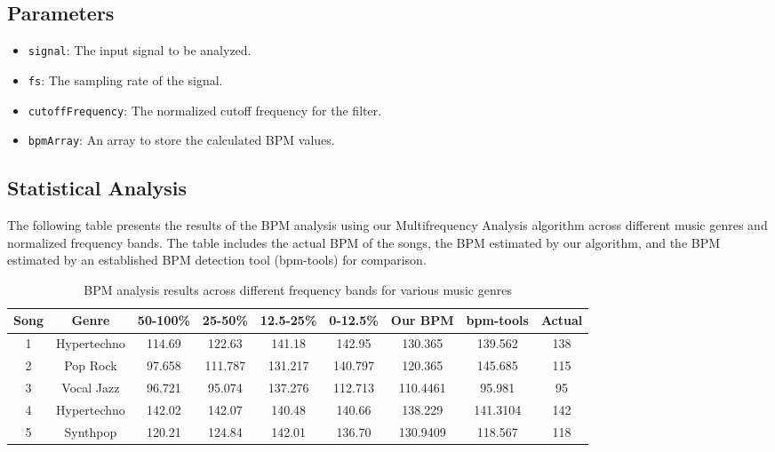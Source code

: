 \subsection{Parameters}
\begin{itemize}
    \item \texttt{signal}: The input signal to be analyzed.
    \item \texttt{fs}: The sampling rate of the signal.
    \item \texttt{cutoffFrequency}: The normalized cutoff frequency for the filter.
    \item \texttt{bpmArray}: An array to store the calculated BPM values.
\end{itemize}

\subsection{Statistical Analysis}

The following table presents the results of the BPM analysis using our Multifrequency Analysis algorithm across different music genres and normalized frequency bands. The table includes the actual BPM of the songs, the BPM estimated by our algorithm, and the BPM estimated by an established BPM detection tool (bpm-tools) for comparison.

\begin{table}[H]
    \centering
    \small
    \begin{tabular}{|c|c|c|c|c|c|c|c|c|}
        \hline
        \textbf{Song} & \textbf{Genre} & \textbf{50-100\%} & \textbf{25-50\%} & \textbf{12.5-25\%} & \textbf{0-12.5\%} & \textbf{Our BPM} & \textbf{bpm-tools} & \textbf{Actual} \\ \hline
        1 & Hypertechno & 114.69 & 122.63 & 141.18 & 142.95 & 130.365 & 139.562 & 138 \\ \hline
        2 & Pop Rock & 97.658 & 111.787 & 131.217 & 140.797 & 120.365 & 145.685 & 115 \\ \hline
        3 & Vocal Jazz & 96.721 & 95.074 & 137.276 & 112.713 & 110.4461 & 95.981 & 95 \\ \hline
        4 & Hypertechno & 142.02 & 142.07 & 140.48 & 140.66 & 138.229 & 141.3104 & 142 \\ \hline
        5 & Synthpop & 120.21 & 124.84 & 142.01 & 136.70 & 130.9409 & 118.567 & 118 \\ \hline
    \end{tabular}
    \caption{BPM analysis results across different frequency bands for various music genres}
    \label{tab:bpm_analysis}
\end{table}

